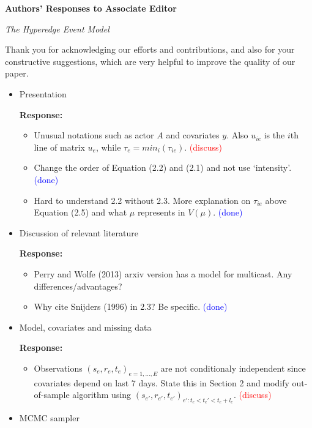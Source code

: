 \documentclass[12pt]{article}
\date{\today}
\theoremstyle{definition}
\begin{document}


\begin{center}
\textbf{Authors' Responses to Associate Editor}
\end{center}
\begin{center}
\textsl{The Hyperedge Event Model}
\end{center}

Thank you for acknowledging our efforts and contributions, and also for your constructive suggestions, which are very helpful to improve the quality of our paper. 

\begin{itemize}
	\item Presentation

	\textbf{  Response:} 
	\begin{itemize}
		\item Unusual notations such as actor $A$ and covariates $y$. Also $u_{ie}$ is the $i$th line of matrix $u_e$, while $\tau_e = min_i(\tau_{ie})$. \textcolor{red}{(discuss)} 
		\item Change the order of Equation (2.2) and (2.1) and not use `intensity'. \textcolor{blue}{(done)}
		\item Hard to understand 2.2 without 2.3. More explanation on $\tau_{ie}$ above Equation (2.5) and what $\mu$ represents in $V(\mu)$. \textcolor{blue}{(done)}
	\end{itemize}

	\item Discussion of relevant literature

	\textbf{  Response:} 
	\begin{itemize}
		\item Perry and Wolfe (2013) arxiv version has a model for multicast. Any differences/advantages?
		\item Why cite Snijders (1996) in 2.3? Be specific. \textcolor{blue}{(done)}
	\end{itemize}
	
	\item Model, covariates and missing data
	
		\textbf{  Response:} 
		\begin{itemize}
			\item Observations $(s_e, r_e, t_e)_{e=1,\ldots,E}$ are not conditionaly independent since covariates depend on last 7 days. State this in Section 2 and modify out-of-sample algorithm using $(s_{e'}, r_{e'}, t_{e'})_{e':t_e<t_e'<t_e+l_e}$.  \textcolor{red}{(discuss)} 
		\end{itemize}
	\item MCMC sampler
	

\end{itemize}
\end{document}
